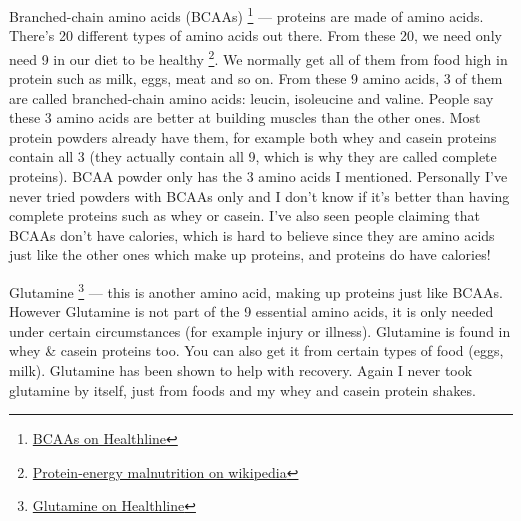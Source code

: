 \documentclass[openany, 12pt]{book}
\begin{document}
        Branched-chain amino acids (BCAAs)
        \footnote{\href{https://www.healthline.com/nutrition/bcaa}{BCAAs on Healthline}} --- proteins are made of amino acids. There's 20 different types of amino
        acids out there. From these 20, we need only need 9 in our diet to be healthy
        \footnote{\href{https://en.wikipedia.org/wiki/Protein\%E2\%80\%93energy\_malnutrition}{Protein-energy malnutrition on wikipedia}}. We normally get all of them from food
        high in protein such as milk, eggs, meat and so on. From these 9 amino acids, 3 of them are called branched-chain amino acids: leucin, isoleucine and valine. People say these 3 amino acids
        are better at building muscles than the other ones. Most protein powders already have them, for example both whey and casein proteins contain all 3 (they actually contain all 9, which is
        why they are called complete proteins). BCAA powder only has the 3 amino acids I mentioned. Personally I've never tried powders with BCAAs only and I don't know if it's better than having
        complete proteins such as whey or casein. I've also seen people claiming that BCAAs don't have calories, which is hard to believe since they are amino acids just like the other ones which
        make up proteins, and proteins do have calories!

        Glutamine
        \footnote{\href{https://www.healthline.com/nutrition/glutamine}{Glutamine on Healthline}} --- this is another amino acid, making up proteins just like BCAAs. However Glutamine is
        not part of the 9 essential amino acids, it is only needed under certain circumstances (for example injury or illness). Glutamine is found in whey \& casein proteins too. You can also get
        it from certain types of food (eggs, milk). Glutamine has been shown to help with recovery. Again I never took glutamine by itself, just from foods and my whey and casein protein shakes.
\end{document}
